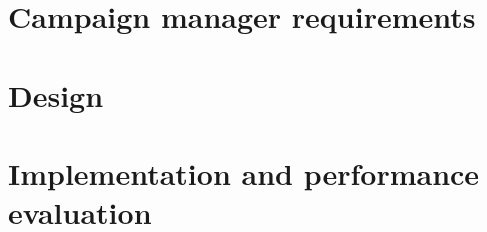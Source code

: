 \label{ch:cmanager}

\section{Campaign manager requirements}

\section{Design}

\section{Implementation and performance evaluation}